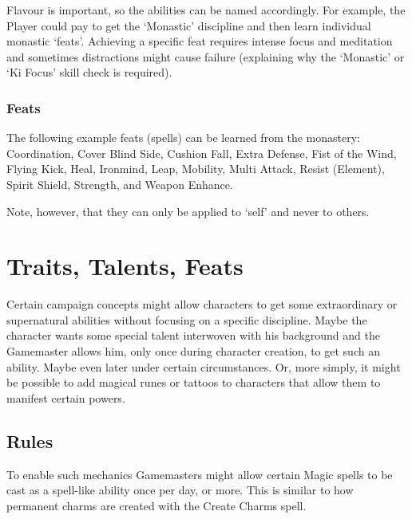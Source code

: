 Flavour is important, so the abilities can be named accordingly. For example, the Player could pay to get the `Monastic' discipline and then learn individual monastic `feats'. Achieving a specific feat requires intense focus and meditation and sometimes distractions might cause failure (explaining why the `Monastic' or `Ki Focus' skill check is required).

\subsubsection{Feats}
The following example feats (spells) can be learned from the monastery: Coordination, Cover Blind Side, Cushion Fall, Extra Defense, Fist of the Wind, Flying Kick, Heal, Ironmind, Leap, Mobility, Multi Attack, Resist (Element), Spirit Shield, Strength, and Weapon Enhance.

Note, however, that they can only be applied to `self' and never to others.





\section{Traits, Talents, Feats}

Certain campaign concepts might allow characters to get some extraordinary or supernatural abilities without focusing on a specific discipline. Maybe the character wants some special talent interwoven with his background and the Gamemaster allows him, only once during character creation, to get such an ability. Maybe even later under certain circumstances. Or, more simply, it might be possible to add magical runes or tattoos to characters that allow them to manifest certain powers.

\subsection{Rules}
To enable such mechanics Gamemasters might allow certain Magic spells to be cast as a spell-like ability once per day, or more. This is similar to how permanent charms are created with the Create Charms spell.

